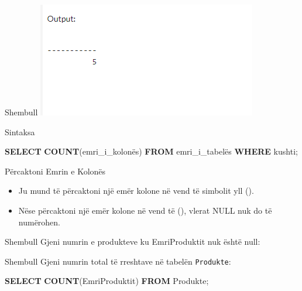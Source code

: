 \documentclass[
  ignorenonframetext,
]{beamer}
\newenvironment{Shaded}{\begin{snugshade}}{\end{snugshade}}
\newcommand{\FunctionTok}[1]{\textcolor[rgb]{0.13,0.29,0.53}{\textbf{#1}}}
\newcommand{\KeywordTok}[1]{\textcolor[rgb]{0.13,0.29,0.53}{\textbf{#1}}}
\newcommand{\NormalTok}[1]{#1}
\begin{document}
\begin{frame}{Shembull}
\label{shembull-23}
\includegraphics{./Figs/query46.png}
\end{frame}

\begin{frame}[fragile]{Sintaksa}
\label{sintaksa}

\begin{Shaded}
\begin{Highlighting}[]
\KeywordTok{SELECT} \FunctionTok{COUNT}\NormalTok{(emri\_i\_kolonës)}
\KeywordTok{FROM}\NormalTok{ emri\_i\_tabelës}
\KeywordTok{WHERE}\NormalTok{ kushti;}
\end{Highlighting}
\end{Shaded}
\end{frame}

\begin{frame}{Përcaktoni Emrin e Kolonës}
\label{puxebrcaktoni-emrin-e-kolonuxebs}
\begin{itemize}
\item
  Ju mund të përcaktoni një emër kolone në vend të simbolit yll ().
\item
  Nëse përcaktoni një emër kolone në vend të (), vlerat NULL nuk do të
  numërohen.
\end{itemize}
\end{frame}

\begin{frame}{Shembull}
\label{shembull-24}
Gjeni numrin e produkteve ku EmriProduktit nuk është null:

\end{frame}

\begin{frame}[fragile]{Shembull}
\label{shembull-25}
Gjeni numrin total të rreshtave në tabelën \texttt{Produkte}:


\begin{Shaded}
\begin{Highlighting}[]
\KeywordTok{SELECT} \FunctionTok{COUNT}\NormalTok{(EmriProduktit)}
\KeywordTok{FROM}\NormalTok{ Produkte;}
\end{Highlighting}
\end{Shaded}
\end{frame}
\end{document}
